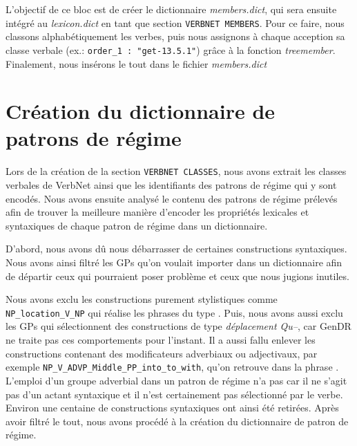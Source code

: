 L'objectif de ce bloc est de créer le dictionnaire \emph{members.dict}, qui sera ensuite intégré au \emph{lexicon.dict} en tant que section \texttt{VERBNET MEMBERS}. Pour ce faire, nous classons alphabétiquement les verbes, puis nous assignons à chaque acception sa classe verbale (ex.: \lstinline|order_1 : "get-13.5.1"|) grâce à la fonction \emph{treemember}. Finalement, nous insérons le tout dans le fichier \emph{members.dict}


\section{Création du dictionnaire de patrons de régime}\label{sec:creategpcon}

Lors de la création de la section \texttt{VERBNET CLASSES}, nous avons extrait les classes verbales de VerbNet ainsi que les identifiants des patrons de régime qui y sont encodés. Nous avons ensuite analysé le contenu des patrons de régime prélevés afin de trouver la meilleure manière d'encoder les propriétés lexicales et syntaxiques de chaque patron de régime dans un dictionnaire.

D'abord, nous avons dû nous débarrasser de certaines constructions syntaxiques. Nous avons ainsi filtré les \acp{GP} qu'on voulait importer dans un dictionnaire afin de départir ceux qui pourraient poser problème et ceux que nous jugions inutiles.

Nous avons exclu les constructions purement stylistiques comme \lstinline|NP_location_V_NP| qui réalise les phrases du type . Puis, nous avons aussi exclu les \acp{GP} qui sélectionnent des constructions de type \emph{déplacement Qu--}, car GenDR ne traite pas ces comportements pour l'instant. Il a aussi fallu enlever les constructions contenant des modificateurs adverbiaux ou adjectivaux, par exemple \lstinline|NP_V_ADVP_Middle_PP_into_to_with|, qu'on retrouve dans la phrase . L'emploi d'un groupe adverbial dans un patron de régime n'a pas car il ne s'agit pas d'un actant syntaxique et il n'est certainement pas sélectionné par le verbe. Environ une centaine de constructions syntaxiques ont ainsi été retirées. Après avoir filtré le tout, nous avons procédé à la création du dictionnaire de patron de régime.

